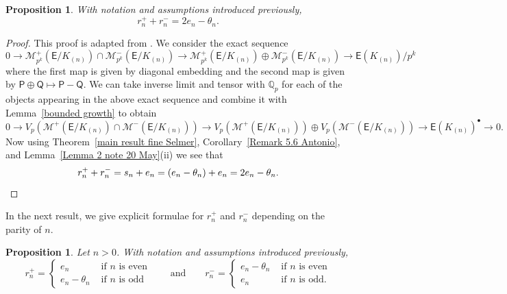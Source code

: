 \documentclass{amsart}
\newtheorem{proposition}[theorem]{Proposition}
\numberwithin{equation}{section}
\theoremstyle{remark}
\newcommand{\EC}{\mathsf{E}}
\newcommand{\cM}{\mathcal{M}}
\newcommand{\Qp}{\mathbb{Q}_p}
\theoremstyle{plain} %
\begin{document}
\begin{proposition}
\label{prop 6.10}
With notation and assumptions introduced previously, 
\[
r_n^+ + r_n^- = 2e_n - \theta_n.
\]
\end{proposition}

\begin{proof}
This proof is adapted from \cite[Corollary~6.7]{Lei23}.
We consider the exact sequence
\[
0 \longrightarrow \cM^{+}_{p^k}(\EC/K_{(n)}) \cap \cM^{-}_{p^k}(\EC/K_{(n)}) \longrightarrow \cM^{+}_{p^k}(\EC/K_{(n)}) \oplus \cM^{-}_{p^k}(\EC/K_{(n)}) \longrightarrow \EC(K_{(n)})/p^k
\]
where the first map is given by diagonal embedding and the second map is given by $\mathsf{P} \oplus \mathsf{Q} \mapsto \mathsf{P} - \mathsf{Q}$.
We can take inverse limit and tensor with $\Qp$ for each of the objects appearing in the above exact sequence and combine it with Lemma~\ref{bounded growth} to obtain
\[
0 \rightarrow V_p(\cM^{+}(\EC/K_{(n)}) \cap \cM^{-}(\EC/K_{(n)}) )\rightarrow V_p(\cM^{+}(\EC/K_{(n)})) \oplus V_p(\cM^{-}(\EC/K_{(n)})) \rightarrow \EC(K_{(n)})^{\bullet} \rightarrow 0.
\]
Now using Theorem~\ref{main result fine Selmer}, Corollary~\ref{Remark 5.6 Antonio}, and Lemma~\ref{Lemma 2 note 20 May}(ii) we see that
\[
r_n^+ + r_n^- = s_n + e_n = (e_n - \theta_n) + e_n = 2e_n - \theta_n. \qedhere
\]
\end{proof}

In the next result, we give explicit formulae for $r_n^+$ and $r_n^-$ depending on the parity of $n$.

\begin{proposition}
\label{Prop 3 note 21 May}  
Let $n>0$.
With notation and assumptions introduced previously,
\[
r_n^+ = \begin{cases}
    e_n & \text{ if } n \text{ is even}\\
    e_n -\theta_n & \text{ if } n \text{ is odd}
\end{cases} \quad \quad \text{and} \quad \quad r_n^- = \begin{cases}
    e_n - \theta_n & \text{ if } n \text{ is even}\\
    e_n & \text{ if } n \text{ is odd.}
\end{cases}
\]
\end{proposition}
\end{document}
